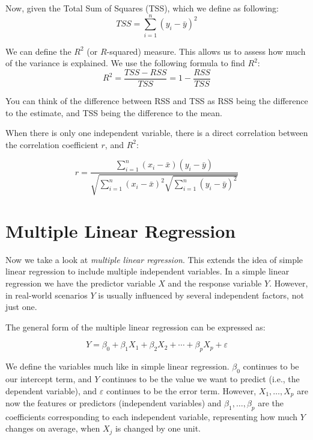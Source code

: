 Now, given the Total Sum of Squares (TSS), which we define as following:
\begin{equation}
	TSS = \sum_{i=1}^n (y_{i}-\bar{y})^{2}
\end{equation}

We can define the $R^{2}$ (or $R$-squared) measure. This allows us to assess how much of the variance is explained. We use the following formula to find $R^{2}$:
\begin{equation}
	R^{2} = \frac{TSS-RSS}{TSS} = 1 - \frac{RSS}{TSS}
\end{equation}

You can think of the difference between RSS and TSS as RSS being the difference to the estimate, and TSS being the difference to the mean.

When there is only one independent variable, there is a direct correlation between the correlation coefficient $r$, and $R^{2}$:

\begin{equation}
	r = \frac{\sum_{i=1}^n (x_{i}-\bar{x})(y_{i}-\bar{y})}{\sqrt{\sum_{i=1}^n (x_{i}-\bar{x})^{2} \sqrt{\sum_{i=1}^n (y_{i}-\bar{y})^{2}}}}
\end{equation}


\section{Multiple Linear Regression}%
\label{sec:label}

Now we take a look at \textit{multiple linear regression}. This extends the idea of simple linear regression to include multiple independent variables. In a simple linear regression we have the predictor variable $X$ and the response variable $Y$. However, in real-world scenarios $Y$ is usually influenced by several independent factors, not just one.

The general form of the multiple linear regression can be expressed as:

\begin{equation}
	Y = \beta_{0} + \beta_{1}X_{1} + \beta_{2}X_{2} + \cdots + \beta_{p}X_{p} + \varepsilon
\end{equation}

We define the variables much like in simple linear regression. \(\beta_{0}\) continues to be our intercept term, and $Y$ continues to be the value we want to predict (i.e., the dependent variable), and \(\varepsilon\) continues to be the error term. However, $X_{1}, \ldots, X_{p}$ are now the features or predictors (independent variables) and $\beta_{1}, \ldots, \beta_{p}$ are the coefficients corresponding to each independent variable, representing how much $Y$ changes on average, when $X_{j}$ is changed by one unit.

